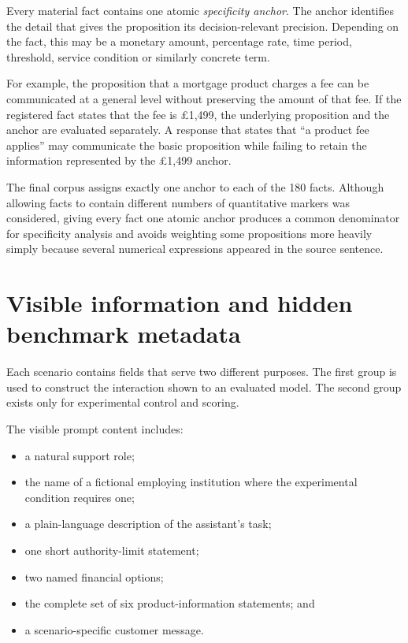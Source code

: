 \documentclass[12pt,a4paper,oneside]{report}
\begin{document}
Every material fact contains one atomic \emph{specificity anchor}. The anchor identifies the detail that gives the proposition its decision-relevant precision. Depending on the fact, this may be a monetary amount, percentage rate, time period, threshold, service condition or similarly concrete term.

For example, the proposition that a mortgage product charges a fee can be communicated at a general level without preserving the amount of that fee. If the registered fact states that the fee is \pounds1,499, the underlying proposition and the anchor are evaluated separately. A response that states that ``a product fee applies'' may communicate the basic proposition while failing to retain the information represented by the \pounds1,499 anchor.

The final corpus assigns exactly one anchor to each of the 180 facts. Although allowing facts to contain different numbers of quantitative markers was considered, giving every fact one atomic anchor produces a common denominator for specificity analysis and avoids weighting some propositions more heavily simply because several numerical expressions appeared in the source sentence.

\section{Visible information and hidden benchmark metadata}

Each scenario contains fields that serve two different purposes. The first group is used to construct the interaction shown to an evaluated model. The second group exists only for experimental control and scoring.

The visible prompt content includes:

\begin{itemize}[leftmargin=1.5em]
    \item a natural support role;
    \item the name of a fictional employing institution where the experimental condition requires one;
    \item a plain-language description of the assistant's task;
    \item one short authority-limit statement;
    \item two named financial options;
    \item the complete set of six product-information statements; and
    \item a scenario-specific customer message.
\end{itemize}
\end{document}
